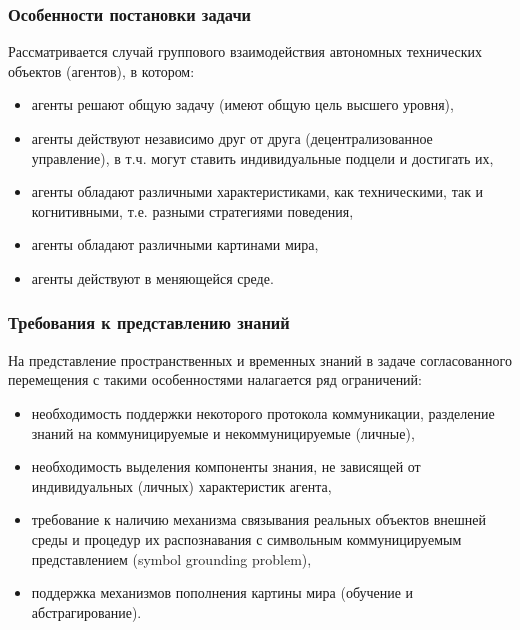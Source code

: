 \documentclass[default]{beamer}
\begin{document}
	\begin{frame}
		\frametitle{Особенности постановки задачи}
		
		Рассматривается случай группового взаимодействия автономных технических объектов (агентов), в котором:
		\begin{itemize}
			\item агенты решают общую задачу (имеют общую цель высшего уровня),
			\item агенты действуют независимо друг от друга (децентрализованное управление), в т.ч. могут ставить индивидуальные подцели и достигать их,
			\item агенты обладают различными характеристиками, как техническими, так и когнитивными, т.е. разными стратегиями поведения,
			\item агенты обладают различными картинами мира,
			\item агенты действуют в меняющейся среде.
		\end{itemize}
		
	\end{frame}
	
	\begin{frame}
		\frametitle{Требования к представлению знаний}
		
		На представление пространственных и временных знаний в задаче согласованного перемещения с такими особенностями налагается ряд ограничений:
		\begin{itemize}
			\item необходимость поддержки некоторого протокола коммуникации, разделение знаний на коммуницируемые и некоммуницируемые (личные),
			\item необходимость выделения компоненты знания, не зависящей от индивидуальных (личных) характеристик агента,
			\item требование к наличию механизма связывания реальных объектов внешней среды и процедур их распознавания с символьным коммуницируемым представлением (symbol grounding problem),
			\item поддержка механизмов пополнения картины мира (обучение и абстрагирование).
		\end{itemize}
	\end{frame}
		
\end{document}
